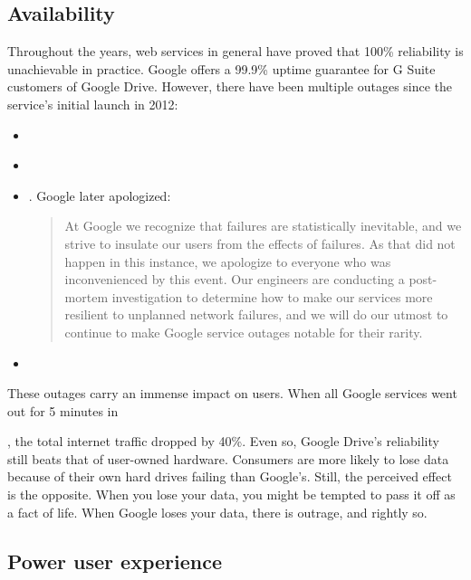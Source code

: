 \subsection{Availability}

Throughout the years, web services in general have proved that 100\% reliability is unachievable in practice. Google offers a 99.9\% uptime guarantee for G Suite customers of Google Drive. However, there have been multiple outages since the service's initial launch in 2012:

\begin{itemize}
  \itemsep0em
  \item \date{March 2013}\cite{google_drive_experiencing_outage}
  \item \date{October 2014}\cite{google_drive_and_docs_down}
  \item \date{January 2016}\cite{gmail_google_drive_down}. Google later apologized:
    \begin{quote}
      At Google we recognize that failures are statistically inevitable, and we strive to insulate our users from the effects of failures. As that did not happen in this instance, we apologize to everyone who was inconvenienced by this event. Our engineers are conducting a post-mortem investigation to determine how to make our services more resilient to unplanned network failures, and we will do our utmost to continue to make Google service outages notable for their rarity.
    \end{quote}
  \item \date{September 2017}\cite{google_suffered_a_meltdown}
\end{itemize}

These outages carry an immense impact on users. When all Google services went out for 5 minutes in \date{August 2013}, the total internet traffic dropped by 40\%.\cite{google_goes_down_for_5_minutes} Even so, Google Drive's reliability still beats that of user-owned hardware. Consumers are more likely to lose data because of their own hard drives failing than Google's. Still, the perceived effect is the opposite. When you lose your data, you might be tempted to pass it off as a fact of life. When Google loses your data, there is outrage, and rightly so.

\subsection{Power user experience} \label{power_user_experience}

